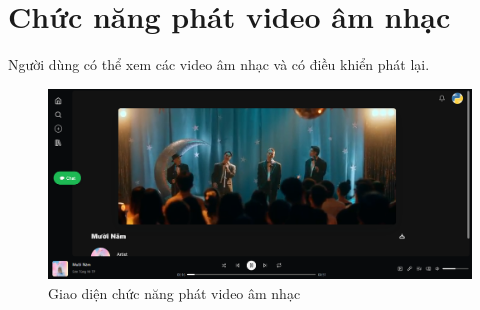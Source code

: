 \section{Chức năng phát video âm nhạc}
Người dùng có thể xem các video âm nhạc và có điều khiển phát lại.

\begin{figure}[H]
    \centering
    \includegraphics[width=1\textwidth]{imgs/chap5/phat_video.png}
    \caption{Giao diện chức năng phát video âm nhạc}
\end{figure}